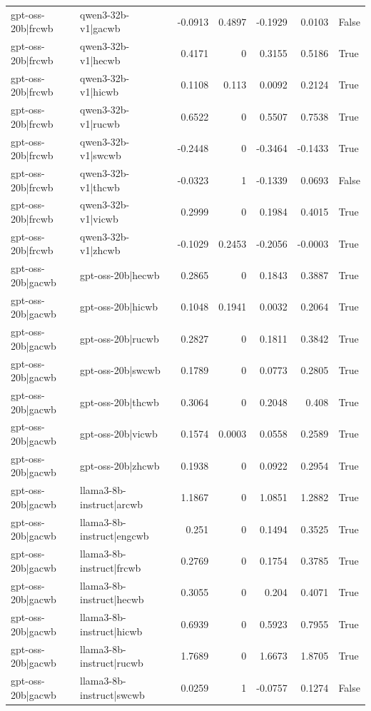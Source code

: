 \begin{table}
\begin{tabular}{l l r r r r l}
gpt-oss-20b|frcwb & qwen3-32b-v1|gacwb & -0.0913 & 0.4897 & -0.1929 & 0.0103 & False \\
gpt-oss-20b|frcwb & qwen3-32b-v1|hecwb & 0.4171 & 0 & 0.3155 & 0.5186 & True \\
gpt-oss-20b|frcwb & qwen3-32b-v1|hicwb & 0.1108 & 0.113 & 0.0092 & 0.2124 & True \\
gpt-oss-20b|frcwb & qwen3-32b-v1|rucwb & 0.6522 & 0 & 0.5507 & 0.7538 & True \\
gpt-oss-20b|frcwb & qwen3-32b-v1|swcwb & -0.2448 & 0 & -0.3464 & -0.1433 & True \\
gpt-oss-20b|frcwb & qwen3-32b-v1|thcwb & -0.0323 & 1 & -0.1339 & 0.0693 & False \\
gpt-oss-20b|frcwb & qwen3-32b-v1|vicwb & 0.2999 & 0 & 0.1984 & 0.4015 & True \\
gpt-oss-20b|frcwb & qwen3-32b-v1|zhcwb & -0.1029 & 0.2453 & -0.2056 & -0.0003 & True \\
gpt-oss-20b|gacwb & gpt-oss-20b|hecwb & 0.2865 & 0 & 0.1843 & 0.3887 & True \\
gpt-oss-20b|gacwb & gpt-oss-20b|hicwb & 0.1048 & 0.1941 & 0.0032 & 0.2064 & True \\
gpt-oss-20b|gacwb & gpt-oss-20b|rucwb & 0.2827 & 0 & 0.1811 & 0.3842 & True \\
gpt-oss-20b|gacwb & gpt-oss-20b|swcwb & 0.1789 & 0 & 0.0773 & 0.2805 & True \\
gpt-oss-20b|gacwb & gpt-oss-20b|thcwb & 0.3064 & 0 & 0.2048 & 0.408 & True \\
gpt-oss-20b|gacwb & gpt-oss-20b|vicwb & 0.1574 & 0.0003 & 0.0558 & 0.2589 & True \\
gpt-oss-20b|gacwb & gpt-oss-20b|zhcwb & 0.1938 & 0 & 0.0922 & 0.2954 & True \\
gpt-oss-20b|gacwb & llama3-8b-instruct|arcwb & 1.1867 & 0 & 1.0851 & 1.2882 & True \\
gpt-oss-20b|gacwb & llama3-8b-instruct|engcwb & 0.251 & 0 & 0.1494 & 0.3525 & True \\
gpt-oss-20b|gacwb & llama3-8b-instruct|frcwb & 0.2769 & 0 & 0.1754 & 0.3785 & True \\
gpt-oss-20b|gacwb & llama3-8b-instruct|hecwb & 0.3055 & 0 & 0.204 & 0.4071 & True \\
gpt-oss-20b|gacwb & llama3-8b-instruct|hicwb & 0.6939 & 0 & 0.5923 & 0.7955 & True \\
gpt-oss-20b|gacwb & llama3-8b-instruct|rucwb & 1.7689 & 0 & 1.6673 & 1.8705 & True \\
gpt-oss-20b|gacwb & llama3-8b-instruct|swcwb & 0.0259 & 1 & -0.0757 & 0.1274 & False \\

\end{tabular}
\end{table}
